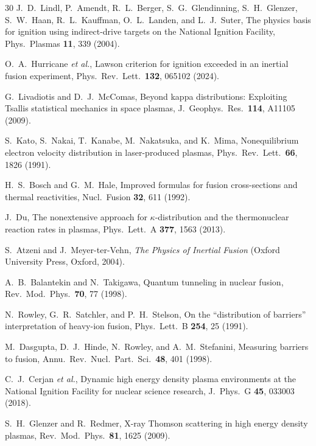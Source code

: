 \documentclass[prc,twocolumn,superscriptaddress,longbibliography,floatfix]{revtex4-2}
\begin{document}
\begin{thebibliography}{30}
J.~D.~Lindl, P.~Amendt, R.~L.~Berger, S.~G.~Glendinning,
S.~H.~Glenzer, S.~W.~Haan, R.~L.~Kauffman,
O.~L.~Landen, and L.~J.~Suter,
The physics basis for ignition using indirect-drive targets on the
National Ignition Facility,
Phys.\ Plasmas \textbf{11}, 339 (2004).

O.~A.~Hurricane \textit{et al.},
Lawson criterion for ignition exceeded in an inertial fusion
experiment,
Phys.\ Rev.\ Lett.\ \textbf{132}, 065102 (2024).

G.~Livadiotis and D.~J.~McComas,
Beyond kappa distributions: Exploiting Tsallis statistical mechanics
in space plasmas,
J.\ Geophys.\ Res.\ \textbf{114}, A11105 (2009).

S.~Kato, S.~Nakai, T.~Kanabe, M.~Nakatsuka, and K.~Mima,
Nonequilibrium electron velocity distribution in laser-produced
plasmas,
Phys.\ Rev.\ Lett.\ \textbf{66}, 1826 (1991).

H.~S.~Bosch and G.~M.~Hale,
Improved formulas for fusion cross-sections and thermal reactivities,
Nucl.\ Fusion \textbf{32}, 611 (1992).

J.~Du,
The nonextensive approach for $\kappa$-distribution and the
thermonuclear reaction rates in plasmas,
Phys.\ Lett.\ A \textbf{377}, 1563 (2013).

S.~Atzeni and J.~Meyer-ter-Vehn,
\textit{The Physics of Inertial Fusion}
(Oxford University Press, Oxford, 2004).

A.~B.~Balantekin and N.~Takigawa,
Quantum tunneling in nuclear fusion,
Rev.\ Mod.\ Phys.\ \textbf{70}, 77 (1998).

N.~Rowley, G.~R.~Satchler, and P.~H.~Stelson,
On the ``distribution of barriers'' interpretation of heavy-ion
fusion,
Phys.\ Lett.\ B \textbf{254}, 25 (1991).

M.~Dasgupta, D.~J.~Hinde, N.~Rowley, and A.~M.~Stefanini,
Measuring barriers to fusion,
Annu.\ Rev.\ Nucl.\ Part.\ Sci.\ \textbf{48}, 401 (1998).

C.~J.~Cerjan \textit{et al.},
Dynamic high energy density plasma environments at the National
Ignition Facility for nuclear science research,
J.\ Phys.\ G \textbf{45}, 033003 (2018).

S.~H.~Glenzer and R.~Redmer,
X-ray Thomson scattering in high energy density plasmas,
Rev.\ Mod.\ Phys.\ \textbf{81}, 1625 (2009).


\end{thebibliography}
\end{document}
